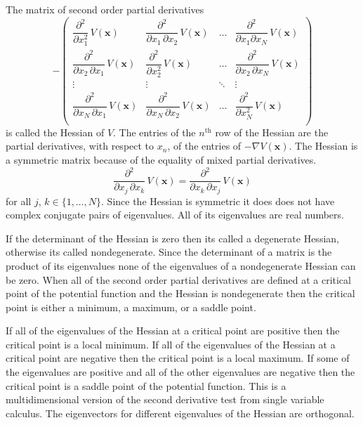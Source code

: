    The matrix of second order partial derivatives
\begin{equation*}
-
\begin{pmatrix}
\dfrac{\partial^2}{\partial x_1^2}\, V(\mathbf{x}) &
\dfrac{\partial^2}{\partial x_1 \, \partial x_2}\, V(\mathbf{x}) &
\ldots & \dfrac{\partial^2}{\partial x_1 \partial x_N}\, V(\mathbf{x})  \\[4mm]
\dfrac{\partial^2}{\partial x_2 \, \partial x_1}\, V(\mathbf{x}) &
\dfrac{\partial^2}{\partial x_2^2}\, V(\mathbf{x}) &
\ldots & \dfrac{\partial^2}{\partial x_2\,  \partial x_N}\, V(\mathbf{x})  
\\[4mm]
   \vdots & \vdots & \ddots & \vdots \\[4mm]
\dfrac{\partial^2}{\partial x_N \, \partial x_1}\, V(\mathbf{x}) &
\dfrac{\partial^2}{\partial x_N \, \partial x_2}\, V(\mathbf{x}) &
\ldots & \dfrac{\partial^2}{\partial x_N^2}\, V(\mathbf{x})  \\[4mm]
\end{pmatrix}
\end{equation*}
is called the Hessian of $V$.  The entries of the $n^{\mathrm{th}}$ row of the
Hessian are the partial derivatives, with respect to $x_n$, of the entries of 
$-\nabla V(\mathbf{x})$.  The Hessian is a symmetric matrix because of the 
equality of mixed partial derivatives.
\begin{equation*}
\dfrac{\partial^2}{\partial x_j \, \partial x_k}\, V(\mathbf{x}) 
=
\dfrac{\partial^2}{\partial x_k \, \partial x_j}\, V(\mathbf{x}) 
\end{equation*}
for all $j$, $k \in \{1, \ldots, N\}$.  Since the Hessian is symmetric it does 
does not have complex conjugate pairs of eigenvalues.  All of its eigenvalues 
are real numbers. 

   If the determinant of the Hessian is zero then its called a degenerate
Hessian, otherwise its called nondegenerate.  Since the determinant of a
matrix is the product of its eigenvalues none of the eigenvalues of a 
nondegenerate Hessian can be zero.  When all of the second order partial 
derivatives are defined at a critical point of the potential function and the 
Hessian is nondegenerate then the critical point is either a minimum, a 
maximum, or a saddle point.  

   If all of the eigenvalues of the Hessian at a critical point are positive 
then the critical point is a local minimum.  If all of the eigenvalues of the 
Hessian at a critical point are negative then the critical point is a local 
maximum.  If some of the eigenvalues are positive and all of the other 
eigenvalues are negative then the critical point is a saddle point of the 
potential function.  This is a multidimensional version of the second 
derivative test from single variable calculus.  The eigenvectors for different 
eigenvalues of the Hessian are orthogonal.

